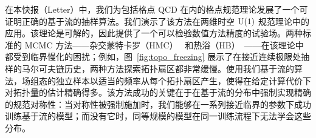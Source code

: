 在本快报（Letter）中，我们为包括格点 QCD 在内的格点规范理论发展了一个可证明正确的基于流的抽样算法。我们演示了该方法在两维时空 $\mathrm{U}(1)$ 规范理论中的应用。该理论是可解的，因此提供了一个可以检验数值方法精度的试验场。两种标准的 MCMC 方法——杂交蒙特卡罗（HMC）~\cite{Duane1987HMC} 和热浴（HB）~\cite{Creutz:1979dw,Cabibbo:1982zn,Kennedy:1985nu}——在该理论中都受到临界慢化的困扰；例如，图~\ref{fig:topo_freezing} 展示了在接近连续极限处抽样的马尔可夫链历史，两种方法探索拓扑扇区都非常缓慢。使用我们基于流的算法，场组态的独立样本以适当的频率从每个拓扑扇区产生，使得在给定计算代价下对拓扑量的估计精确得多。该方法成功的关键在于在基于流的分布中强制实现精确的规范对称性：当对称性被强制施加时，我们能够在一系列接近临界的参数下成功训练基于流的模型；而没有它时，同等规模的模型在同一训练流程下无法学会这些分布。
